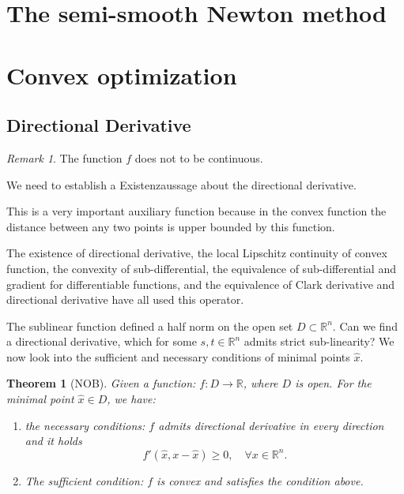 \documentclass[a4paper,11pt,fleqn, draft]{book}
\newtheorem{theorem}{Theorem}[section]
\theoremstyle{definition}
\theoremstyle{remark}
\newtheorem*{remark}{Remark}
\begin{document}
\section{The semi-smooth Newton method}



\section{Convex optimization}
\subsection{Directional Derivative}


\begin{remark}
	The function $f$ does not to be continuous.
\end{remark}
We need to establish a Existenzaussage about the directional derivative.


This is a very important auxiliary function because in the convex function the distance between any two points is upper bounded by this function.\par The existence of directional derivative, the local Lipschitz continuity of convex function, the convexity of sub-differential, the equivalence of sub-differential and gradient for differentiable functions, and the equivalence of Clark derivative and directional derivative have all used this operator. 





The sublinear function defined a half norm on the open set $D \subset \mathbb{R}^n$. Can we find a directional derivative, which for some $s, t \in \mathbb{R}^n$ admits strict sub-linearity?
We now look into the sufficient and necessary conditions of minimal points $\hat{x}$. 


\begin{theorem}[NOB]
	Given a function: $f :D \longrightarrow \mathbb{R}$, where $D$ is open. For the minimal point $\hat{x} \in D$, we have:
	\begin{enumerate}
		\item the necessary conditions: $f$ admits directional derivative in every direction and it holds
		\begin{equation}
			f'(\hat{x}, x - \hat{x}) \geq 0,\quad \forall x \in \mathbb{R}^n	.
		\end{equation}
		\item The sufficient condition: $f$ is convex and satisfies the condition above.
	\end{enumerate}
\end{theorem}
\end{document}
